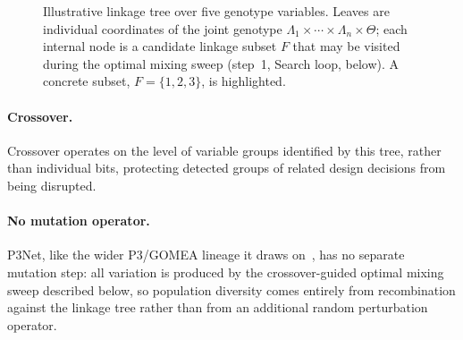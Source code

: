 \begin{figure}[t]
    \centering
    \caption{Illustrative linkage tree over five genotype variables. Leaves are individual coordinates of
    the joint genotype $\Lambda_1 \times \cdots \times \Lambda_n \times \Theta$; each internal node is a
    candidate linkage subset $F$ that may be visited during the optimal mixing sweep (step~1, Search loop,
    below). A concrete subset, $F=\{1,2,3\}$, is highlighted.}
    \label{fig:linkage-tree}
\end{figure}

\paragraph{Crossover.} Crossover operates on the level of variable groups identified by this tree, rather than individual bits, protecting detected groups of related design decisions from being disrupted.

\paragraph{No mutation operator.} P3Net, like the wider P3/GOMEA lineage it draws on~\citep{goldman2014parameterless,thierens2011optimal}, has no separate mutation step: all variation is produced by the crossover-guided optimal mixing sweep described below, so population diversity comes entirely from recombination against the linkage tree rather than from an additional random perturbation operator.

